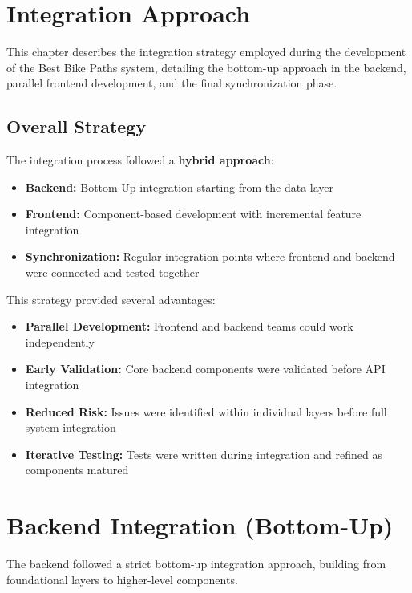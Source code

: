 \section{Integration Approach}
\label{sec:integration_approach}

This chapter describes the integration strategy employed during the development of the Best Bike Paths system, detailing the bottom-up approach in the backend, parallel frontend development, and the final synchronization phase.

\subsection{Overall Strategy}
\label{subsec:overall_strategy}

The integration process followed a \textbf{hybrid approach}:

\begin{itemize}
    \item \textbf{Backend:} Bottom-Up integration starting from the data layer
    \item \textbf{Frontend:} Component-based development with incremental feature integration
    \item \textbf{Synchronization:} Regular integration points where frontend and backend were connected and tested together
\end{itemize}

This strategy provided several advantages:
\begin{itemize}
    \item \textbf{Parallel Development:} Frontend and backend teams could work independently
    \item \textbf{Early Validation:} Core backend components were validated before API integration
    \item \textbf{Reduced Risk:} Issues were identified within individual layers before full system integration
    \item \textbf{Iterative Testing:} Tests were written during integration and refined as components matured
\end{itemize}

\section{Backend Integration (Bottom-Up)}
\label{sec:backend_integration}

The backend followed a strict bottom-up integration approach, building from foundational layers to higher-level components.

